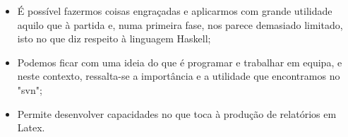 \documentclass[a4paper]{article}
\begin{document}
\begin{itemize} 

        \item É possível fazermos coisas engraçadas e aplicarmos com grande utilidade aquilo que à partida e, numa primeira fase, nos parece demasiado limitado, isto no que diz respeito à linguagem Haskell; 
        \item Podemos ficar com uma ideia do que é programar e trabalhar em equipa, e neste contexto, ressalta-se a importância e a utilidade que encontramos no "svn"; 
        \item Permite desenvolver capacidades no que toca à produção de relatórios em Latex.
\end{itemize}
\end{document}
